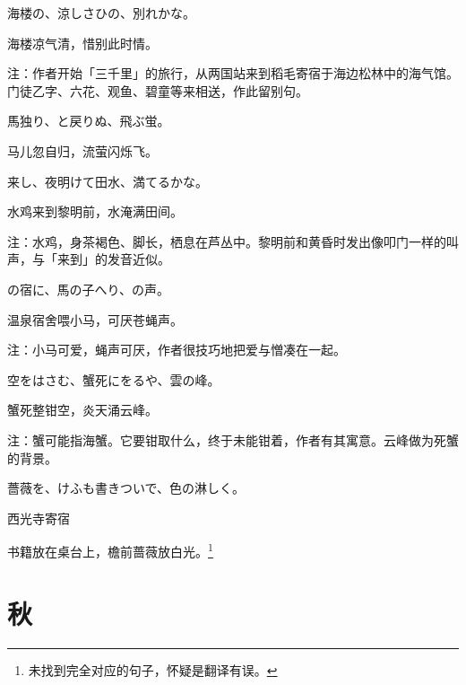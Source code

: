\begin{haiku}
    {\FH 海楼の、涼しさひの、別れかな。}

    {\FK 海楼凉气清，惜别此时情。}

    {\FT 注：作者开始「三千里」的旅行，从两国站来到稻毛寄宿于海边松林中的海气馆。门徒乙字、六花、观鱼、碧童等来相送，作此留别句。}
\end{haiku}

\begin{haiku}
    {\FH 馬独り、と戻りぬ、飛ぶ蛍。}

    {\FK 马儿忽自归，流萤闪烁飞。}
\end{haiku}

\begin{haiku}
    {\FH {}来し、夜明けて田水、満てるかな。}

    {\FK 水鸡来到黎明前，水淹满田间。}

    {\FT 注：水鸡，身茶褐色、脚长，栖息在芦丛中。黎明前和黄昏时发出像叩门一样的叫声，与「来到」的发音近似。}
\end{haiku}

\begin{haiku}
    {\FH {}の宿に、馬の子へり、の声。}

    {\FK 温泉宿舍喂小马，可厌苍蝇声。}

    {\FT 注：小马可爱，蝇声可厌，作者很技巧地把爱与憎凑在一起。}
\end{haiku}

\begin{haiku}
    {\FH 空をはさむ、蟹死にをるや、雲の峰。}

    {\FK 蟹死整钳空，炎天涌云峰。}

    {\FT 注：蟹可能指海蟹。它要钳取什么，终于未能钳着，作者有其寓意。云峰做为死蟹的背景。}
\end{haiku}

\begin{haiku}
    {\FH 薔薇を、けふも書きついで、色の淋しく。}

    {\FK 西光寺寄宿}

    {\FK 书籍放在桌台上，檐前蔷薇放白光。\footnote{\FT 未找到完全对应的句子，怀疑是翻译有误。}}
\end{haiku}

\section{\FK 秋}

